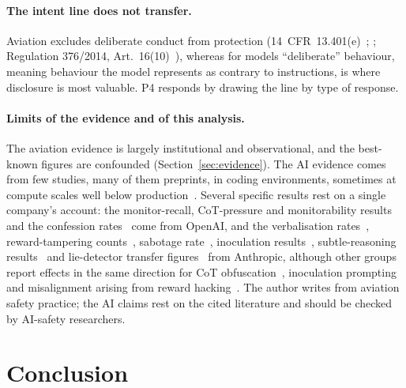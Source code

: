 \documentclass[11pt]{article}
\begin{document}
\paragraph{The intent line does not transfer.} Aviation excludes deliberate conduct from protection (14~CFR~13.401(e)~\cite{cfr13401}; \cite[para.~12.3]{faa2021}; Regulation 376/2014, Art.~16(10)~\cite{eu376}), whereas for models ``deliberate'' behaviour, meaning behaviour the model represents as contrary to instructions, is where disclosure is most valuable. P4 responds by drawing the line by type of response.

\paragraph{Limits of the evidence and of this analysis.} The aviation evidence is largely institutional and observational, and the best-known figures are confounded (Section~\ref{sec:evidence}). The AI evidence comes from few studies, many of them preprints, in coding environments, sometimes at compute scales well below production~\cite{wagner2025}. Several specific results rest on a single company's account: the monitor-recall, CoT-pressure and monitorability results~\cite{baker2025,guan2025} and the confession rates~\cite{joglekar2025} come from OpenAI, and the verbalisation rates~\cite{chen2025}, reward-tampering counts~\cite{denison2024}, sabotage rate~\cite{macdiarmid2025}, inoculation results~\cite{wichers2025}, subtle-reasoning results~\cite{wagner2025} and lie-detector transfer figures~\cite{hopkins2026} from Anthropic, although other groups report effects in the same direction for CoT obfuscation~\cite{emmons2025,skaf2025,drori2025}, inoculation prompting~\cite{tan2025} and misalignment arising from reward hacking~\cite{daniels2026}. The author writes from aviation safety practice; the AI claims rest on the cited literature and should be checked by AI-safety researchers.

\section{Conclusion}\label{sec:conclusion}
\end{document}
